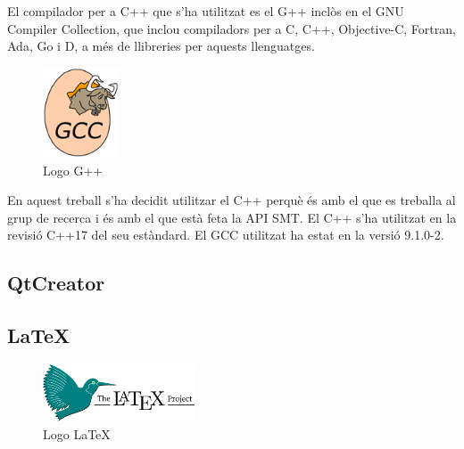 \documentclass[11pt,a4paper,twoside]{report}
\begin{document}
  El compilador per a C++ que s'ha utilitzat es el G++ inclòs en el GNU Compiler Collection, que inclou compiladors per a C, C++, Objective-C, Fortran, Ada, Go i D, a més de llibreries per aquests llenguatges. 
  

  \begin{figure}[ht!]
    \centering
    \includegraphics[width=0.2\textwidth]{Diagrames/gcc.png}
    \caption{Logo G++}
    \label{fig:gpp}
  \end{figure}


  En aquest treball s'ha decidit utilitzar el C++ perquè és amb el que es treballa al grup de recerca i és amb el que està feta la API SMT. El C++ s'ha utilitzat en la revisió C++17 del seu estàndard. El GCC utilitzat ha estat en la versió 9.1.0-2. 

  \subsection{QtCreator}




  \subsection{\LaTeX}
  \begin{figure}[ht!]
    \centering
    \includegraphics[width=0.4\textwidth]{Diagrames/latex.png}
    \caption{Logo \LaTeX}
    \label{fig:latex}
  \end{figure}
  
\end{document}
